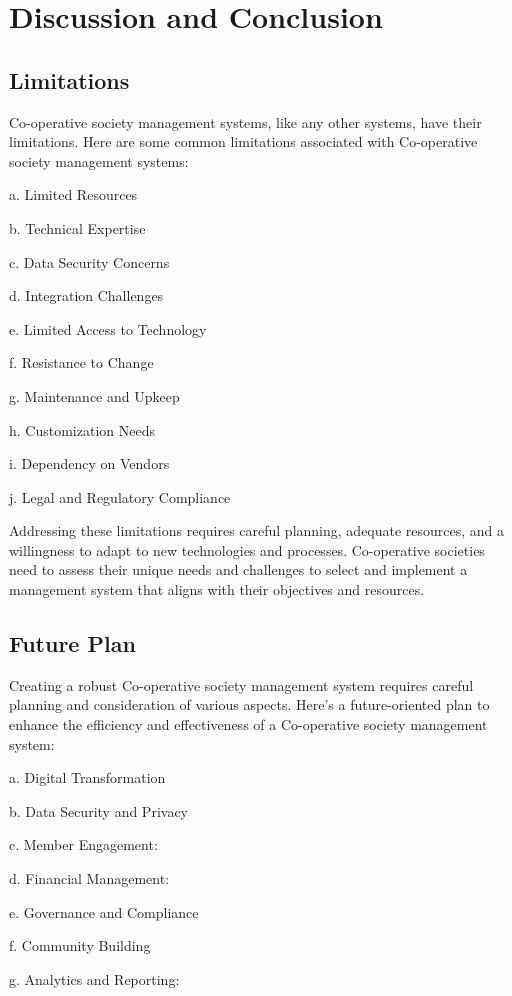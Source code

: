 \chapter{Discussion and Conclusion}



\section{Limitations}
Co-operative society management systems, like any other systems, have their limitations. Here
are some common limitations associated with Co-operative society management systems:

a. Limited Resources

b. Technical Expertise

c. Data Security Concerns

d. Integration Challenges

e. Limited Access to Technology

f. Resistance to Change

g. Maintenance and Upkeep

h. Customization Needs

i. Dependency on Vendors

j. Legal and Regulatory Compliance 

Addressing these limitations requires careful planning, adequate resources, and a willingness to
adapt to new technologies and processes. Co-operative societies need to assess their unique
needs and challenges to select and implement a management system that aligns with their
objectives and resources.

\section{Future Plan}
Creating a robust Co-operative society management system requires careful planning and
consideration of various aspects. Here's a future-oriented plan to enhance the efficiency and
effectiveness of a Co-operative society management system:

a. Digital Transformation

b. Data Security and Privacy

c. Member Engagement:

d. Financial Management:

e. Governance and Compliance

f. Community Building

g. Analytics and Reporting:

